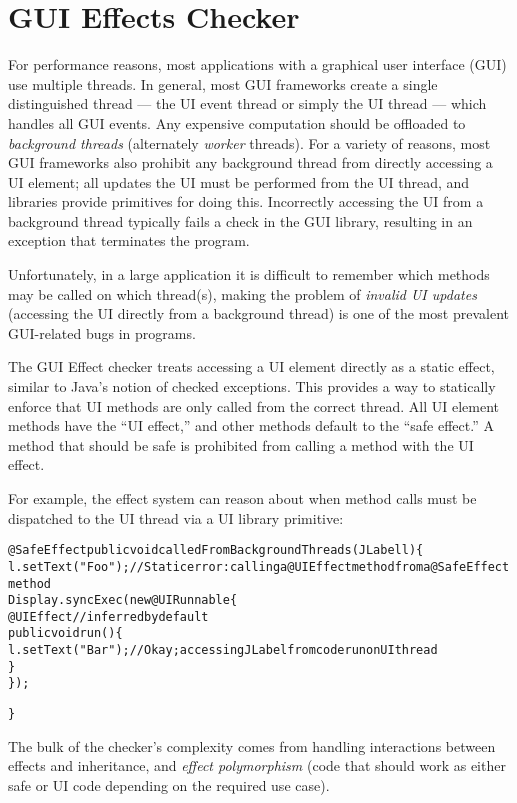 \htmlhr
\chapter{GUI Effects Checker\label{guieffects-checker}}

For performance reasons, most applications with a graphical user interface (GUI) use multiple
threads.  In general, most GUI frameworks create a single distinguished thread --- the UI event thread
or simply the UI thread --- which handles all GUI events.  Any expensive computation should be
offloaded to \emph{background threads} (alternately \emph{worker} threads).  For a variety of
reasons, most GUI frameworks also prohibit any background thread from directly accessing a UI
element; all updates the UI must be performed from the UI thread, and libraries provide primitives
for doing this.  Incorrectly accessing the UI from a background thread typically fails a check in
the GUI library, resulting in an exception that terminates the program.

Unfortunately, in a large application it is difficult to remember which methods may be called on
which thread(s), making the problem of \emph{invalid UI updates} (accessing the UI directly from a
background thread) is one of the most prevalent GUI-related bugs in programs.

The GUI Effect checker treats accessing a UI element directly as a static effect, similar to Java's
notion of checked exceptions.  This provides a way to statically enforce that UI methods are only
called from the correct thread.  All UI element methods have the ``UI effect,'' and other methods
default to the ``safe effect.''  A method that should be safe is prohibited from calling a method
with the UI effect. 

For example, the effect system can reason about when method calls must be dispatched to the UI
thread via a UI library primitive:
\begin{alltt}
@SafeEffect public void calledFromBackgroundThreads(JLabel l) \{
    l.setText("Foo"); // Static error: calling a @UIEffect method from a @SafeEffect method
    Display.syncExec(new @UI Runnable \{
        @UIEffect // inferred by default
        public void run() \{
            l.setText("Bar"); // Okay; accessing JLabel from code run on UI thread
        \}
    \});

\}
\end{alltt}

The bulk of the checker's complexity comes from handling interactions between effects and
inheritance, and \emph{effect polymorphism} (code that should work as either safe or UI code
depending on the required use case).

